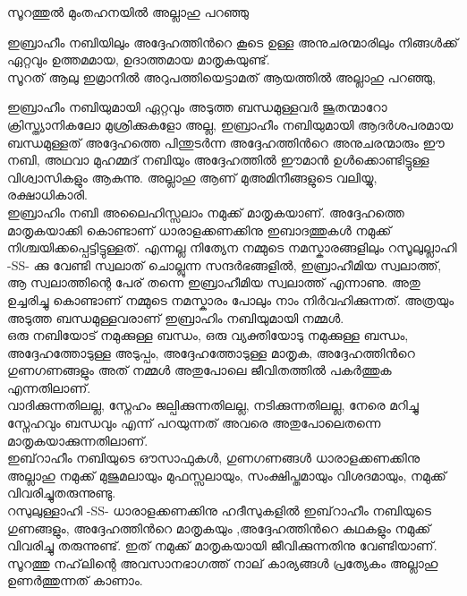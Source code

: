  സൂറത്തുൽ മുംതഹനയിൽ അല്ലാഹു  പറഞ്ഞു 
 
\textarabic{\quranayah[60][4]}
  
 ഇബ്രാഹീം നബിയിലും  അദ്ദേഹത്തിൻറെ കൂടെ ഉള്ള അനുചരന്മാരിലും നിങ്ങൾക്ക് ഏറ്റവും ഉത്തമമായ, ഉദാത്തമായ മാതൃകയുണ്ട്. \\
 
 സൂറത് ആലു ഇമ്രാനിൽ അറുപത്തിയെട്ടാമത് ആയത്തിൽ അല്ലാഹു പറഞ്ഞു, 
 
 \textarabic{\quranayah[3][68]}
 
 ഇബ്രാഹീം നബിയുമായി ഏറ്റവും അടുത്ത ബന്ധമുള്ളവർ ജൂതന്മാറോ ക്രിസ്ത്യാനികലോ മുശ്രിക്കുകളോ അല്ല,  ഇബ്രാഹീം നബിയുമായി  ആദർശപരമായ ബന്ധമുള്ളത് അദ്ദേഹത്തെ പിന്തുടർന്ന അദ്ദേഹത്തിൻറെ അനുചരന്മാരും ഈ നബി, അഥവാ മുഹമ്മദ് നബിയും  അദ്ദേഹത്തിൽ ഈമാൻ ഉൾക്കൊണ്ടിട്ടുള്ള വിശ്വാസികളും ആകുന്നു. അല്ലാഹു ആണ് മുഅമിനീങ്ങളുടെ വലിയ്യു, രക്ഷാധികാരി. \\
 
 
  ഇബ്രാഹിം നബി അലൈഹിസ്സലാം നമുക്ക് മാതൃകയാണ്. അദ്ദേഹത്തെ മാതൃകയാക്കി കൊണ്ടാണ് ധാരാളക്കണക്കിനു ഇബാദത്തുകൾ നമുക്ക് നിശ്ചയിക്കപ്പെട്ടിട്ടുള്ളത്. എന്നല്ല നിത്യേന നമ്മുടെ നമസ്കാരങ്ങളിലും റസൂലുല്ലാഹി -SS- ക്കു വേണ്ടി സ്വലാത് ചൊല്ലുന്ന സന്ദർഭങ്ങളിൽ, ഇബ്രാഹീമിയ സ്വലാത്ത്, ആ സ്വലാത്തിന്റെ പേര് തന്നെ ഇബ്രാഹീമിയ സ്വലാത്ത് എന്നാണു. അതു ഉച്ചരിച്ചു കൊണ്ടാണ് നമ്മുടെ നമസ്കാരം പോലും നാം  നിർവഹിക്കുന്നത്.  അത്രയും അടുത്ത ബന്ധമുള്ളവരാണ് ഇബ്രാഹിം നബിയുമായി നമ്മൾ.  \\ 
  
  ഒരു നബിയോട് നമുക്കുള്ള ബന്ധം,  ഒരു വ്യക്തിയോടു നമുക്കുള്ള ബന്ധം, അദ്ദേഹത്തോടുള്ള അടുപ്പം, അദ്ദേഹത്തോടുള്ള മാതൃക, അദ്ദേഹത്തിൻറെ ഗുണഗണങ്ങളും അത് നമ്മൾ അതുപോലെ ജീവിതത്തിൽ പകർത്തുക എന്നതിലാണ്. \\
  
  
  വാദിക്കുന്നതിലല്ല, സ്നേഹം ജല്പിക്കുന്നതിലല്ല, നടിക്കുന്നതിലല്ല, നേരെ മറിച്ചു സ്നേഹവും ബന്ധവും എന്ന് പറയുന്നത് അവരെ അതുപോലെതന്നെ മാതൃകയാക്കുന്നതിലാണ്. \\
  
   ഇബ്‌റാഹീം നബിയുടെ ഔസാഫുകൾ,  ഗുണഗണങ്ങൾ ധാരാളക്കണക്കിനു അല്ലാഹു നമുക്ക് മുജുമലായും മുഫസ്സലായും, സംക്ഷിപ്തമായും  വിശദമായും, നമുക്ക് വിവരിച്ചുതരുന്നുണ്ടു. \\
  
  റസുലുള്ളാഹി -SS- ധാരാളക്കണക്കിനു ഹദീസുകളിൽ ഇബ്‌റാഹീം നബിയുടെ  ഗുണങ്ങളും, അദ്ദേഹത്തിൻറെ മാതൃകയും ,അദ്ദേഹത്തിൻറെ കഥകളും നമുക്ക് വിവരിച്ചു തരുന്നുണ്ട്. ഇത് നമുക്ക് മാതൃകയായി ജീവിക്കുന്നതിനു വേണ്ടിയാണ്. \\ 
  
   സൂറത്തു നഹ്‌ലിന്റെ അവസാനഭാഗത്ത് നാല് കാര്യങ്ങൾ പ്രത്യേകം അല്ലാഹു ഉണർത്തുന്നത് കാണാം. \\
  

